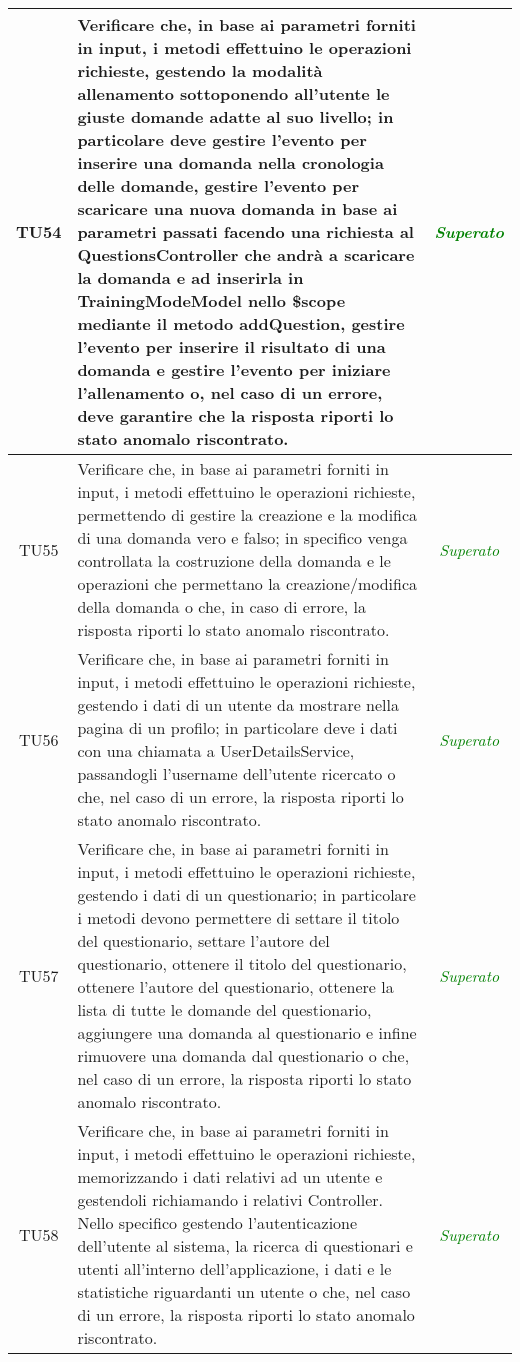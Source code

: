 \begin{longtable}{|c|>{}m{10cm}|c|}
\hypertarget{TU54}{TU54} & Verificare che, in base ai parametri forniti in input, i metodi effettuino le operazioni richieste,  gestendo la modalità allenamento sottoponendo all'utente le giuste domande adatte al suo livello; in particolare deve gestire l'evento per inserire una domanda nella cronologia delle domande, gestire l'evento per scaricare una nuova domanda in base ai parametri
passati facendo una richiesta al QuestionsController che andrà a scaricare la domanda e ad inserirla in TrainingModeModel nello \$scope mediante il metodo addQuestion, gestire l'evento per inserire il risultato di una domanda e gestire l'evento per iniziare l'allenamento o, nel caso di un errore, deve garantire che la risposta riporti lo stato anomalo riscontrato. & \textcolor{Green}{\textit{Superato}}\\ \hline
\hypertarget{TU55}{TU55} & Verificare che, in base ai parametri forniti in input, i metodi effettuino le operazioni richieste, permettendo di gestire la creazione e la modifica di una domanda vero e falso; in specifico venga controllata la costruzione della domanda e le operazioni che permettano la creazione/modifica della domanda o che, in caso di errore, la risposta riporti lo stato anomalo riscontrato. & \textcolor{Green}{\textit{Superato}}\\ \hline
\hypertarget{TU56}{TU56} & Verificare che, in base ai parametri forniti in input, i metodi effettuino le operazioni richieste, gestendo i dati di un utente da mostrare nella pagina di un profilo; in particolare deve i dati con una chiamata a UserDetailsService, passandogli l'username dell'utente ricercato o che, nel caso di un errore, la risposta riporti lo stato anomalo riscontrato. & \textcolor{Green}{\textit{Superato}}\\ \hline
\hypertarget{TU57}{TU57} & Verificare che, in base ai parametri forniti in input, i metodi effettuino le operazioni richieste, gestendo i dati di un questionario; in particolare i metodi devono permettere di settare il titolo del questionario, settare l'autore del questionario, ottenere il titolo del questionario, ottenere l'autore del questionario, ottenere la lista di tutte le domande del questionario, aggiungere una domanda al questionario e infine rimuovere una domanda dal questionario o che, nel caso di un errore, la risposta riporti lo stato anomalo riscontrato. & \textcolor{Green}{\textit{Superato}}\\ \hline
\hypertarget{TU58}{TU58} & Verificare che, in base ai parametri forniti in input, i metodi effettuino le operazioni richieste, memorizzando i dati relativi ad un utente e gestendoli richiamando i relativi Controller. Nello specifico gestendo l'autenticazione dell'utente al sistema, la ricerca di questionari e utenti all'interno dell'applicazione, i dati e le statistiche riguardanti un utente o che, nel caso di un errore, la risposta riporti lo stato anomalo riscontrato. & \textcolor{Green}{\textit{Superato}}\\ \hline

\end{longtable}
